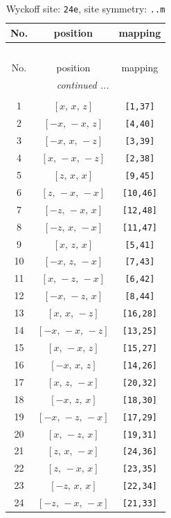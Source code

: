 \documentclass[fleqn,8pt]{jsarticle}
\begin{document}
\renewcommand{\arraystretch}{1.2}
\begin{longtable}{ccc}
\caption{Wyckoff site: {\tt 24e}, site symmetry: {\tt ..m}}
 \\
 \hline \hline
No. & position & mapping \\ \hline \endfirsthead

\multicolumn{2}{l}{\tablename\ \thetable{}} \\
 \hline \hline
No. & position & mapping \\ \hline \endhead

 \hline \hline
\multicolumn{2}{r}{\footnotesize\it continued ...} \\ \endfoot

 \hline \hline
\multicolumn{2}{r}{} \\ \endlastfoot

1 & $\left[ x,\, x,\, z \right]$ & {\tt [1,37]} \\ \hline
2 & $\left[ - x,\, - x,\, z \right]$ & {\tt [4,40]} \\ \hline
3 & $\left[ - x,\, x,\, - z \right]$ & {\tt [3,39]} \\ \hline
4 & $\left[ x,\, - x,\, - z \right]$ & {\tt [2,38]} \\ \hline
5 & $\left[ z,\, x,\, x \right]$ & {\tt [9,45]} \\ \hline
6 & $\left[ z,\, - x,\, - x \right]$ & {\tt [10,46]} \\ \hline
7 & $\left[ - z,\, - x,\, x \right]$ & {\tt [12,48]} \\ \hline
8 & $\left[ - z,\, x,\, - x \right]$ & {\tt [11,47]} \\ \hline
9 & $\left[ x,\, z,\, x \right]$ & {\tt [5,41]} \\ \hline
10 & $\left[ - x,\, z,\, - x \right]$ & {\tt [7,43]} \\ \hline
11 & $\left[ x,\, - z,\, - x \right]$ & {\tt [6,42]} \\ \hline
12 & $\left[ - x,\, - z,\, x \right]$ & {\tt [8,44]} \\ \hline
13 & $\left[ x,\, x,\, - z \right]$ & {\tt [16,28]} \\ \hline
14 & $\left[ - x,\, - x,\, - z \right]$ & {\tt [13,25]} \\ \hline
15 & $\left[ x,\, - x,\, z \right]$ & {\tt [15,27]} \\ \hline
16 & $\left[ - x,\, x,\, z \right]$ & {\tt [14,26]} \\ \hline
17 & $\left[ x,\, z,\, - x \right]$ & {\tt [20,32]} \\ \hline
18 & $\left[ - x,\, z,\, x \right]$ & {\tt [18,30]} \\ \hline
19 & $\left[ - x,\, - z,\, - x \right]$ & {\tt [17,29]} \\ \hline
20 & $\left[ x,\, - z,\, x \right]$ & {\tt [19,31]} \\ \hline
21 & $\left[ z,\, x,\, - x \right]$ & {\tt [24,36]} \\ \hline
22 & $\left[ z,\, - x,\, x \right]$ & {\tt [23,35]} \\ \hline
23 & $\left[ - z,\, x,\, x \right]$ & {\tt [22,34]} \\ \hline
24 & $\left[ - z,\, - x,\, - x \right]$ & {\tt [21,33]} \\
\end{longtable}
\end{document}
